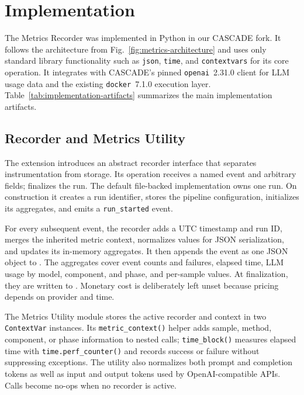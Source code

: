 \section{Implementation}
\label{sec:implementation}

The Metrics Recorder was implemented in Python in our CASCADE fork. It follows
the architecture from Fig.~\ref{fig:metrics-architecture} and uses only standard
library functionality such as \texttt{json}, \texttt{time}, and
\texttt{contextvars} for its core operation. It integrates with CASCADE's pinned
\texttt{openai}~2.31.0 client for LLM usage data and the existing
\texttt{docker}~7.1.0 execution layer. Table~\ref{tab:implementation-artifacts}
summarizes the main implementation artifacts.

\subsection{Recorder and Metrics Utility}
\label{sec:implementation-recorder}

The extension introduces an abstract recorder interface that separates
instrumentation from storage. Its  operation receives a
named event and arbitrary fields;  finalizes the run. The
default file-backed implementation owns one run. On construction it creates a
run identifier, stores the pipeline configuration, initializes its aggregates,
and emits a \texttt{run\_started} event.

For every subsequent event, the recorder adds a UTC timestamp and run ID, merges
the inherited metric context, normalizes values for JSON serialization, and
updates its in-memory aggregates. It then appends the event as one JSON object to
. The aggregates cover event counts and failures,
elapsed time, LLM usage by model, component, and phase, and per-sample values.
At finalization, they are written to . Monetary cost
is deliberately left unset because pricing depends on provider and time.

The Metrics Utility module stores the active recorder and context in two
\texttt{ContextVar} instances. Its \texttt{metric\_context()}
helper adds sample, method, component, or phase information to nested calls;
\texttt{time\_block()} measures elapsed time with \texttt{time.perf\_counter()}
and records success or failure without suppressing exceptions. The utility also
normalizes both prompt and completion tokens as well as input and output tokens
used by OpenAI-compatible APIs. Calls become no-ops when no recorder is active.

